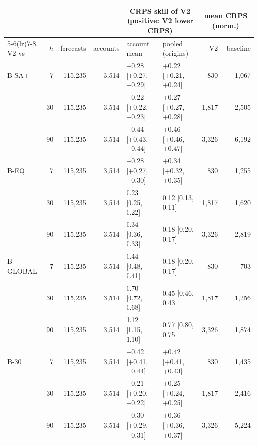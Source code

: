 \begin{tabular}{l r rr ll rr}
\toprule
 & & & & \multicolumn{2}{c}{CRPS skill of V2 (positive: V2 lower CRPS)} & \multicolumn{2}{c}{mean CRPS (norm.)}\\
\cmidrule(lr){5-6}\cmidrule(lr){7-8}
V2 vs & $h$ & forecasts & accounts & account mean & pooled (origins) & V2 & baseline\\
\midrule
B-SA+ & 7 & 115{,}235 & 3{,}514 & +0.28 {\scriptsize[+0.27, +0.29]} & +0.22 {\scriptsize[+0.21, +0.24]} & 830 & 1{,}067 \\
 & 30 & 115{,}235 & 3{,}514 & +0.22 {\scriptsize[+0.22, +0.23]} & +0.27 {\scriptsize[+0.27, +0.28]} & 1{,}817 & 2{,}505 \\
 & 90 & 115{,}235 & 3{,}514 & +0.44 {\scriptsize[+0.43, +0.44]} & +0.46 {\scriptsize[+0.46, +0.47]} & 3{,}326 & 6{,}192 \\
\addlinespace[2pt]
B-EQ & 7 & 115{,}235 & 3{,}514 & +0.28 {\scriptsize[+0.27, +0.30]} & +0.34 {\scriptsize[+0.32, +0.35]} & 830 & 1{,}255 \\
 & 30 & 115{,}235 & 3{,}514 & \textminus{}0.23 {\scriptsize[\textminus{}0.25, \textminus{}0.22]} & \textminus{}0.12 {\scriptsize[\textminus{}0.13, \textminus{}0.11]} & 1{,}817 & 1{,}620 \\
 & 90 & 115{,}235 & 3{,}514 & \textminus{}0.34 {\scriptsize[\textminus{}0.36, \textminus{}0.33]} & \textminus{}0.18 {\scriptsize[\textminus{}0.20, \textminus{}0.17]} & 3{,}326 & 2{,}819 \\
\addlinespace[2pt]
B-GLOBAL & 7 & 115{,}235 & 3{,}514 & \textminus{}0.44 {\scriptsize[\textminus{}0.48, \textminus{}0.41]} & \textminus{}0.18 {\scriptsize[\textminus{}0.20, \textminus{}0.17]} & 830 & 703 \\
 & 30 & 115{,}235 & 3{,}514 & \textminus{}0.70 {\scriptsize[\textminus{}0.72, \textminus{}0.68]} & \textminus{}0.45 {\scriptsize[\textminus{}0.46, \textminus{}0.43]} & 1{,}817 & 1{,}256 \\
 & 90 & 115{,}235 & 3{,}514 & \textminus{}1.12 {\scriptsize[\textminus{}1.15, \textminus{}1.10]} & \textminus{}0.77 {\scriptsize[\textminus{}0.80, \textminus{}0.75]} & 3{,}326 & 1{,}874 \\
\addlinespace[2pt]
B-30 & 7 & 115{,}235 & 3{,}514 & +0.42 {\scriptsize[+0.41, +0.44]} & +0.42 {\scriptsize[+0.41, +0.43]} & 830 & 1{,}435 \\
 & 30 & 115{,}235 & 3{,}514 & +0.21 {\scriptsize[+0.20, +0.22]} & +0.25 {\scriptsize[+0.24, +0.25]} & 1{,}817 & 2{,}416 \\
 & 90 & 115{,}235 & 3{,}514 & +0.30 {\scriptsize[+0.29, +0.31]} & +0.36 {\scriptsize[+0.36, +0.37]} & 3{,}326 & 5{,}224 \\

\end{tabular}
